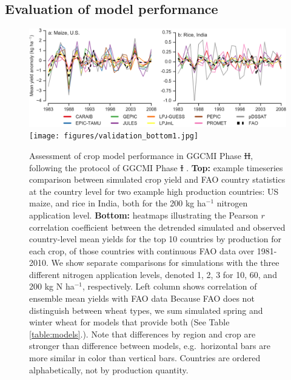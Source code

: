 \documentclass[gmd, manuscript]{copernicus} %
\providecommand{\DIFadd}[1]{{\protect\color{blue}\uwave{#1}}} %
\providecommand{\DIFdel}[1]{{\protect\color{red}\sout{#1}}}                      %
\providecommand{\DIFaddFL}[1]{\DIFadd{#1}} %
\providecommand{\DIFdelFL}[1]{\DIFdel{#1}} %
\providecommand{\DIFaddbeginFL}{} %
\providecommand{\DIFaddendFL}{} %
\providecommand{\DIFdelbeginFL}{} %
\providecommand{\DIFdelendFL}{} %
\begin{document}
\subsection{Evaluation of model performance}
\begin{figure}[ht]
  \centering
  \includegraphics[width=14.5cm]{figures/validation_top.png}
  \texttt{[image: figures/validation\_bottom1.jpg]}
  \caption{
  Assessment of crop model performance in GGCMI Phase \DIFdelbeginFL \DIFdelFL{II}\DIFdelendFL \DIFaddbeginFL \DIFaddFL{2}\DIFaddendFL , following the protocol of GGCMI Phase \DIFdelbeginFL \DIFdelFL{I }\DIFdelendFL \DIFaddbeginFL \DIFaddFL{1 }\DIFaddendFL \citep{muller_global_2017}. 
  \textbf{Top:} example timeseries comparison between simulated crop yield and FAO country statistics \citep{FAOSTAT} at the country level for two example high production countries: US maize, and rice in India, both for the 200 kg ha$^{-1}$ nitrogen application level. 
  \textbf{Bottom:} heatmaps illustrating the Pearson $r$ correlation coefficient between the detrended simulated and observed country-level mean yields for the top 10 countries by production for each crop, of those countries with continuous FAO data over 1981-2010.
  We show separate comparisons for simulations with the three different nitrogen application levels, denoted 1, 2, 3 for 10, 60, and 200 kg N ha$^{-1}$, respectively. 
  Left column shows correlation of ensemble mean yields with FAO data 
  Because FAO does not distinguish between wheat types, we sum simulated spring and winter wheat for models that provide both (See Table \ref{table:models}.). 
  Note that differences by region and crop are stronger than difference between models, e.g.\ horizontal bars are more similar in color than vertical bars.
  Countries are ordered alphabetically, not by production quantity.
  }
  \label{fig:simulation_val}
\end{figure}
\end{document}
